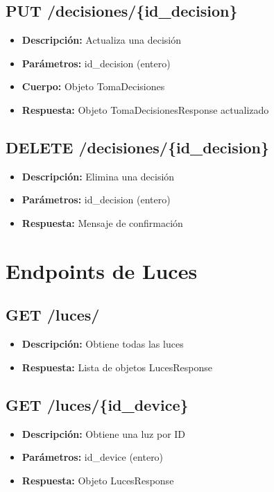 \documentclass[12pt,letterpaper]{report}
\begin{document}
\subsection{PUT /decisiones/\{id\_decision\}}
\begin{itemize}
    \item \textbf{Descripción:} Actualiza una decisión
    \item \textbf{Parámetros:} id\_decision (entero)
    \item \textbf{Cuerpo:} Objeto TomaDecisiones
    \item \textbf{Respuesta:} Objeto TomaDecisionesResponse actualizado
\end{itemize}

\subsection{DELETE /decisiones/\{id\_decision\}}
\begin{itemize}
    \item \textbf{Descripción:} Elimina una decisión
    \item \textbf{Parámetros:} id\_decision (entero)
    \item \textbf{Respuesta:} Mensaje de confirmación
\end{itemize}

\section{Endpoints de Luces}
\subsection{GET /luces/}
\begin{itemize}
    \item \textbf{Descripción:} Obtiene todas las luces
    \item \textbf{Respuesta:} Lista de objetos LucesResponse
\end{itemize}

\subsection{GET /luces/\{id\_device\}}
\begin{itemize}
    \item \textbf{Descripción:} Obtiene una luz por ID
    \item \textbf{Parámetros:} id\_device (entero)
    \item \textbf{Respuesta:} Objeto LucesResponse
\end{itemize}
\end{document}
